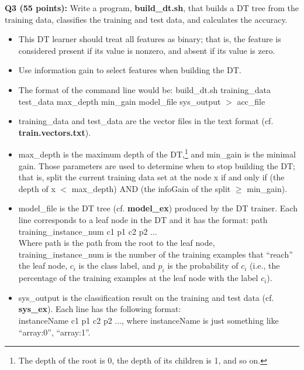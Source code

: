 \documentclass[11pt]{article}
\begin{document}
\hspace{-0.3in}
{\bf Q3 (55 points):} Write a program, {\bf build\_dt.sh}, 
that builds a DT tree from
the training data, classifies the training and test data, and calculates
the accuracy.
\begin{itemize} 
   \item This DT learner should treat all features as binary; that is,
        the feature is considered present if its value is nonzero, and
        absent if its value is zero.

   \item Use information gain to select features when building the DT.

  \item The format of the command line would be:
        build\_dt.sh training\_data test\_data max\_depth min\_gain model\_file sys\_output $>$ acc\_file 

  \item training\_data and test\_data are the vector files in the text format
        (cf. {\bf train.vectors.txt}).

  \item max\_depth is the maximum depth of the DT,\footnote{The depth of 
        the root is 0, the depth of its children is 1, and so on.}
        and min\_gain is the minimal gain. Those parameters are used
        to determine when to stop building the DT; that is, 
        split the current training data set at the node x
        if and only if (the depth of x $<$ max\_depth)
        AND (the infoGain of the split $\ge$ min\_gain).

      \item model\_file is the DT tree (cf. {\bf model\_ex}) produced by
        the DT trainer.
        Each line corresponds to a leaf node in the DT and it has the format: 
        path training\_instance\_num c1 p1 c2 p2 ...\\
        Where path is the path from the root to the leaf node, 
        training\_instance\_num is the number of the training examples
        that ``reach'' the leaf node, $c_i$ is the class label, and
        $p_i$ is the probability of $c_i$ (i.e., the percentage of 
        the training examples at the leaf node with the label $c_i$).

  \item sys\_output is the classification result on the training and
        test data (cf. {\bf sys\_ex}).
        Each line has the following format: \\
        instanceName c1 p1 c2 p2 ...,
        where instanceName is just something
        like ``array:0'', ``array:1''.
        

\end{itemize}
\end{document}

